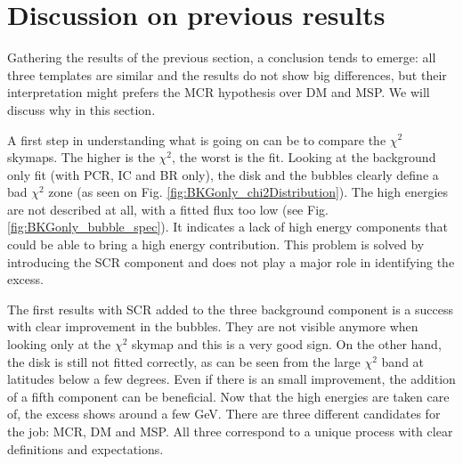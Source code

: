 


\newpage
\section{Discussion on previous results}
%

Gathering the results of the previous section, a conclusion tends to emerge: all three templates are similar and the results do not show big differences, but their interpretation might prefers the MCR hypothesis over DM and MSP. We will discuss why in this section.

A first step in understanding what is going on can be to compare the $\chi^2$ skymaps. The higher is the $\chi^2$, the worst is the fit. Looking at the background only fit (with PCR, IC and BR only), the disk and the bubbles clearly define a bad $\chi^2$ zone (as seen on Fig. \ref{fig:BKGonly_chi2Distribution}). The high energies are not described at all, with a fitted flux too low (see Fig. \ref{fig:BKGonly_bubble_spec}). It indicates a lack of high energy components that could be able to bring a high energy contribution. This problem is solved by introducing the SCR component and does not play a major role in identifying the excess.


The first results with SCR added to the three background component is a success with clear improvement in the bubbles. They are not visible anymore when looking only at the $\chi^2$ skymap and this is a very good sign. On the other hand, the disk is still not fitted correctly, as can be seen from the large $\chi^2$ band at latitudes below a few degrees. Even if there is an small improvement, the addition of a fifth component can be beneficial.
Now that the high energies are taken care of, the excess shows around a few GeV. There are three different candidates for the job: MCR, DM and MSP. All three correspond to a unique process with clear definitions and expectations.



